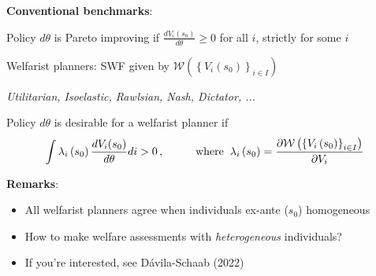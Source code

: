 \documentclass[10pt]{beamer}
\begin{document}
\begin{frame}{}
\vspace{4mm}
{\color{myblue} \textbf{Conventional benchmarks}}:
\begin{itemize}
	{\small
		
		\vspace{2mm}
		\item Policy $d \theta$ is {\color{myorange} Pareto improving} if $\frac{ d V_i(s_0) }{d \theta} \geq 0$ for all $i$, strictly for some $i$
		
		\vspace{0mm}
		\item {\color{myorange}Welfarist planners}: \hspace{0.5mm} SWF given by \hspace{0.2mm} $\mathcal{W}\left(\left\{ V_{i}\left(s_{0}\right)\right\} _{i\in I}\right)$
		
		\vspace{0.5mm}
		{\footnotesize \textit{Utilitarian, Isoelastic, Rawlsian, Nash, Dictator, ...}}
		
		\vspace{0mm}
		\item Policy $d \theta$ is desirable for a {\color{myorange} welfarist planner} if
		\vspace*{-1mm}
		\begin{equation*}
			\int \lambda_{i}\left(s_{0}\right) \frac{ d V_i(s_0) }{d \theta} d i > 0 \, , \hspace{10mm}  \text{where} \hspace{2mm} \lambda_{i}\left(s_{0}\right)=\frac{\partial\mathcal{W}\left(\left\{ V_{i}\left(s_{0}\right)\right\} _{i\in I}\right)}{\partial V_{i}}
		\end{equation*}
		}
\end{itemize}

\vspace{6mm}
{\color{navyblue} \textbf{Remarks}}:
{\small
\begin{itemize}
\item All welfarist planners agree when individuals ex-ante ($s_0$) homogeneous

\vspace{-1mm}
\item How to make welfare assessments with \textit{heterogeneous} individuals?

\vspace{-1mm}
\item If you're interested, see D\'avila-Schaab (2022)
\end{itemize}
}
\end{frame}
\end{document}
